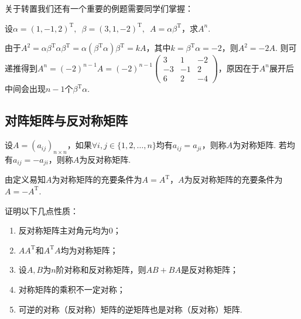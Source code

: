 关于转置我们还有一个重要的例题需要同学们掌握：
\begin{example}\label{ex:9:转置求幂}
    设$\alpha=(1,-1,2)^\mathrm{T},\enspace\beta=(3,1,-2)^\mathrm{T},\enspace A=\alpha\beta^\mathrm{T}$，求$A^n$.
\end{example}

\begin{solution}
    由于$A^2=\alpha\beta^\mathrm{T}\alpha\beta^\mathrm{T}=\alpha(\beta^\mathrm{T}\alpha)\beta^\mathrm{T}=kA$，其中$k=\beta^\mathrm{T}\alpha=-2$，则$A^2=-2A$. 则可递推得到$A^n=(-2)^{n-1}A=(-2)^{n-1}\begin{pmatrix}
        3 & 1 & -2 \\ -3 & -1 & 2 \\ 6 & 2 & -4
    \end{pmatrix}$，原因在于$A^n$展开后中间会出现$n-1$个$\beta^\mathrm{T}\alpha$.
\end{solution}

\subsection{对阵矩阵与反对称矩阵}

\begin{definition}
    设$A=(a_{ij})_{n \times n}$，如果$\forall i,j\in\{1,2,\ldots,n\}$均有$a_{ij}=a_{ji}$，则称$A$为对称矩阵. 若均有$a_{ij}=-a_{ji}$，则称$A$为反对称矩阵.
\end{definition}
由定义易知$A$为对称矩阵的充要条件为$A=A^\mathrm{T}$，$A$为反对称矩阵的充要条件为$A=-A^\mathrm{T}$.
\begin{example}
    证明以下几点性质：
    \begin{enumerate}
        \item 反对称矩阵主对角元均为0；

        \item $AA^\mathrm{T}$和$A^\mathrm{T}A$均为对称矩阵；

        \item 设$A,B$为$n$阶对称和反对称矩阵，则$AB+BA$是反对称矩阵；

        \item 对称矩阵的乘积不一定对称；

        \item 可逆的对称（反对称）矩阵的逆矩阵也是对称（反对称）矩阵.
    \end{enumerate}
\end{example}

